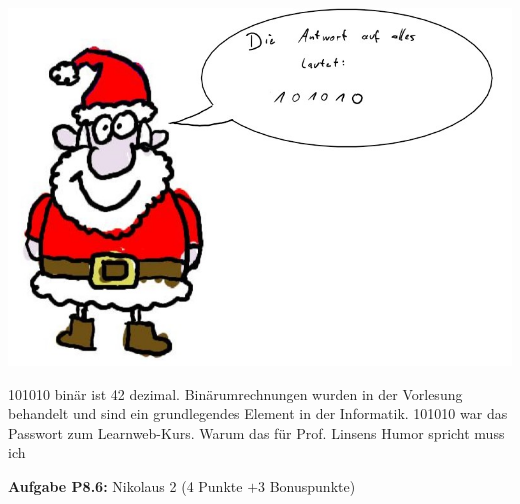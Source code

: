 \begin{center}
  \includegraphics[width=15cm]{witz.jpg}
\end{center}

101010 binär ist 42 dezimal. Binärumrechnungen wurden in der Vorlesung behandelt und sind ein grundlegendes Element in der Informatik. 101010 war das Passwort zum Learnweb-Kurs. Warum das für Prof. Linsens Humor spricht muss ich 

\newpage

\textbf{Aufgabe P8.6:} Nikolaus 2 (4 Punkte $+3$ Bonuspunkte)

